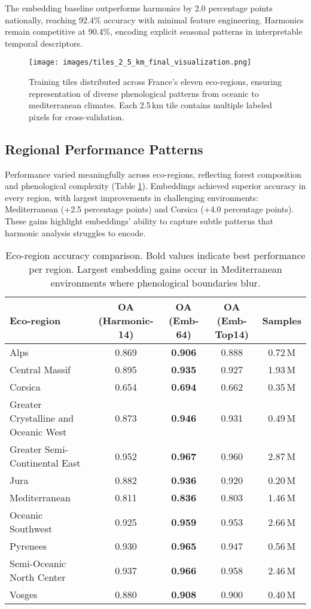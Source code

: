 \documentclass[utf8]{FrontiersinHarvard}
\begin{document}
The embedding baseline outperforms harmonics by 2.0 percentage points nationally, reaching 92.4\% accuracy with minimal feature engineering. Harmonics remain competitive at 90.4\%, encoding explicit seasonal patterns in interpretable temporal descriptors.

\begin{figure}[H]
    \centering
    \texttt{[image: images/tiles\_2\_5\_km\_final\_visualization.png]}
    \caption{Training tiles distributed across France's eleven eco-regions, ensuring representation of diverse phenological patterns from oceanic to mediterranean climates. Each 2.5\,km tile contains multiple labeled pixels for cross-validation.}
    \label{fig:training_tiles}
\end{figure}

\subsection{Regional Performance Patterns}

Performance varied meaningfully across eco-regions, reflecting forest composition and phenological complexity (Table \ref{tab:eco_region_comparison}). Embeddings achieved superior accuracy in every region, with largest improvements in challenging environments: Mediterranean (+2.5 percentage points) and Corsica (+4.0 percentage points). These gains highlight embeddings' ability to capture subtle patterns that harmonic analysis struggles to encode.
\begin{table}[H]
\centering
\begin{tabular}{lcccc}
\hline
\textbf{Eco-region} & \textbf{OA (Harmonic-14)} & \textbf{OA (Emb-64)} & \textbf{OA (Emb-Top14)} & \textbf{Samples} \\ \hline
Alps & 0.869 & \textbf{0.906} & 0.888 & 0.72\,M \\
Central Massif & 0.895 & \textbf{0.935} & 0.927 & 1.93\,M \\
Corsica & 0.654 & \textbf{0.694} & 0.662 & 0.35\,M \\
Greater Crystalline and Oceanic West & 0.873 & \textbf{0.946} & 0.931 & 0.49\,M \\
Greater Semi-Continental East & 0.952 & \textbf{0.967} & 0.960 & 2.87\,M \\
Jura & 0.882 & \textbf{0.936} & 0.920 & 0.20\,M \\
Mediterranean & 0.811 & \textbf{0.836} & 0.803 & 1.46\,M \\
Oceanic Southwest & 0.925 & \textbf{0.959} & 0.953 & 2.66\,M \\
Pyrenees & 0.930 & \textbf{0.965} & 0.947 & 0.56\,M \\
Semi-Oceanic North Center & 0.937 & \textbf{0.966} & 0.958 & 2.46\,M \\
Vosges & 0.880 & \textbf{0.908} & 0.900 & 0.40\,M \\ \hline
\end{tabular}
\caption{Eco-region accuracy comparison. Bold values indicate best performance per region. Largest embedding gains occur in Mediterranean environments where phenological boundaries blur.}
\label{tab:eco_region_comparison}
\end{table}
\end{document}
